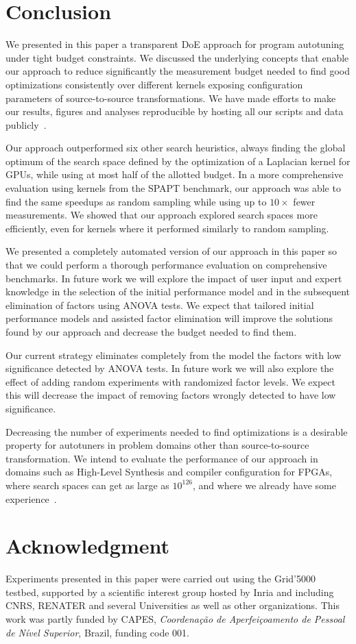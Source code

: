 \documentclass[conference]{IEEEtran}
\begin{document}
\section{Conclusion}
\label{sec:org078d4b6}
We presented in this paper a transparent DoE approach for
program autotuning under tight budget constraints. We discussed the underlying
concepts that enable our approach to reduce significantly the measurement budget
needed to find good optimizations consistently over different kernels exposing
configuration parameters of source-to-source transformations. We have made
efforts to make our results, figures and analyses reproducible by hosting all
our scripts and data publicly~\cite{bruel2018ccgrid19}.

Our approach outperformed six other search heuristics, always finding the global
optimum of the search space defined by the optimization of a Laplacian kernel
for GPUs, while using at most half of the allotted budget. In a more
comprehensive evaluation using kernels from the SPAPT benchmark, our approach
was able to find the same speedups as random sampling while using up to
\(10\times\) fewer measurements. We showed that our approach explored search spaces
more efficiently, even for kernels where it performed similarly to random
sampling.

We presented a completely automated version of our approach in this paper so
that we could perform a thorough performance evaluation on comprehensive
benchmarks. In future work we will explore the impact of user input and expert
knowledge in the selection of the initial performance model and in the
subsequent elimination of factors using ANOVA tests. We expect that tailored
initial performance models and assisted factor elimination will improve the
solutions found by our approach and decrease the budget needed to find them.

Our current strategy eliminates completely from the model the factors with low
significance detected by ANOVA tests. In future work we will also explore the
effect of adding random experiments with randomized factor levels. We expect
this will decrease the impact of removing factors wrongly detected to have low
significance.

Decreasing the number of experiments needed to find optimizations is a desirable
property for autotuners in problem domains other than source-to-source
transformation. We intend to evaluate the performance of our approach in domains
such as High-Level Synthesis and compiler configuration for FPGAs, where search
spaces can get as large as \(10^{126}\), and where we already have some
experience~\cite{bruel2017autotuninghls}.
\section*{Acknowledgment}
\label{sec:orgdeac0d2}
Experiments presented in this paper were carried out using the Grid'5000
testbed, supported by a scientific interest group hosted by Inria and including
CNRS, RENATER and several Universities as well as other organizations.
This work was partly funded by CAPES, \emph{Coordenação de Aperfeiçoamento de Pessoal
de Nível Superior}, Brazil, funding code 001.



\end{document}
